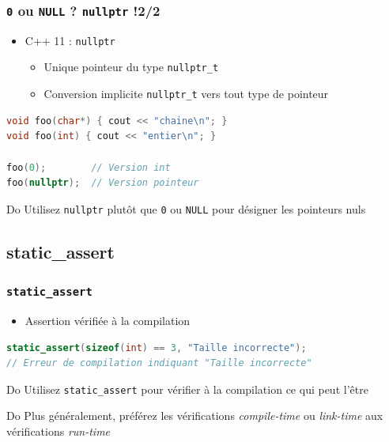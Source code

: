 \documentclass[C++.tex]{subfiles}
\begin{document}
\begin{frame}[fragile]
	\frametitle{\lstinline|0| ou \lstinline|NULL| ? \lstinline|nullptr| !\titlehfill{}2/2}
	\begin{itemize}
		\item C++ 11 : \lstinline|nullptr|
		\begin{itemize}
			\item Unique pointeur du type \lstinline|nullptr_t|
			\item Conversion implicite \lstinline|nullptr_t| vers tout type de pointeur
		\end{itemize}
	\end{itemize}

	\begin{lstlisting}[language=C++]
void foo(char*) { cout << "chaine\n"; }
void foo(int) { cout << "entier\n"; }

foo(0);        // Version int
foo(nullptr);  // Version pointeur\end{lstlisting}

	\begin{exampleblock}{Do}
		Utilisez \lstinline|nullptr| plutôt que \lstinline|0| ou \lstinline|NULL| pour désigner les pointeurs nuls
	\end{exampleblock}
\end{frame}

\subsection*{static\_assert}
\begin{frame}[fragile]
	\frametitle{\lstinline|static_assert|}
	\begin{itemize}
		\item Assertion vérifiée à la compilation
	\end{itemize}

	\begin{lstlisting}[language=C++]
static_assert(sizeof(int) == 3, "Taille incorrecte");
// Erreur de compilation indiquant "Taille incorrecte"\end{lstlisting}

	\begin{exampleblock}{Do}
		Utilisez \lstinline|static_assert| pour vérifier à la compilation ce qui peut l'être
	\end{exampleblock}

	\begin{exampleblock}{Do}
		Plus généralement, préférez les vérifications \textit{compile-time} ou \textit{link-time} aux vérifications \textit{run-time}

	\end{exampleblock}
\end{frame}
\end{document}
